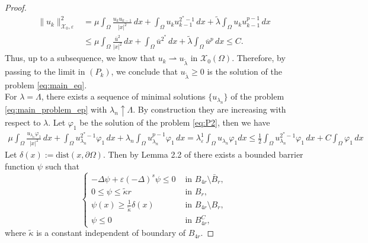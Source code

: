 \documentclass[11pt]{article}
\newcommand{\om} {\Omega}
\newcommand{\la} {\lambda}
\newcommand{\La} {\Lambda}
\newcommand{\ka}{\kappa}
\newcommand{\X}{\mathcal{X}_0} %
\newcommand{\Xe}{\mathcal{X}_{0},\varepsilon} %
\begin{document}
\begin{proof}
\begin{equation*}
\begin{aligned}
\|u_k\|^2_{\Xe} 
&= \mu \int_{\Omega} \frac{u_k u_{k-1}}{|x|^2} \, dx 
+ \int_{\Omega} u_k u_{k-1}^{2^*-1} \, dx 
+ \tilde\lambda \int_{\Omega} u_k u_{k-1}^{p-1} \, dx \\[6pt]
&\leq \mu \int_{\Omega} \frac{\overline{u}^2}{|x|^2} \, dx
+ \int_{\Omega} \overline{u}^{2^*} \, dx 
+ \tilde\lambda \int_{\Omega} \overline{u}^p \, dx \leq C.
\end{aligned}
\end{equation*}
Thus, up to a subsequence, we know that \(u_k \rightharpoonup u_{\tilde\lambda}\) in \(\X(\Omega)\).  
Therefore, by passing to the limit in \((P_k)\), we conclude that \(u_{\tilde\lambda} \geq 0\) is the solution of the problem \eqref{eq:main_eq}. \\
For $\la = \La$, there exists a sequence of minimal solutions $\{ u _{\la_n}\}$ of the problem \eqref{eq:main_problem_ep}
 with $\la_n \uparrow \La$. By construction they are increasing with respect to $\la$. Let $\varphi_1$ be the solution of the problem \eqref{eq:P2}, then we have 
 \begin{equation}\label{eq:bound_minimal_seq}
 \begin{aligned}
 \mu \int_{\Omega} \frac{ u_{\la_n} \varphi_1}{|x|^2} \, dx 
+ \int_{\Omega} u_{\la_n}^{2^*-1} \varphi_1 \, dx 
+ \lambda_n \int_{\Omega} u_{\la_n}^{p-1} \varphi_1 \, dx = \la_{\varepsilon}^1 \int_{\om} u_{\la_n}\varphi_1  dx\leq \frac{1}{2} \int_{\Omega} u_{\la_n}^{2^*-1} \varphi_1 \, dx + C \int_{\om} \varphi_1 \, dx
\end{aligned}
 \end{equation}
 Let $\delta(x):= \text{dist}(x, \partial \Omega)$. Then by Lemma 2.2 of \cite{biswas2023boundary} there exists a bounded barrier function $\psi$ such that
\begin{equation*}
   \begin{cases}
       - \Delta \psi + \varepsilon (-\Delta)^s \psi \leq 0 &\text{ in } B_{4r} \setminus \bar{B}_r,\\
       0 \leq \psi \leq \tilde\ka r &\text{ in } B_r,\\
       \psi(x) \geq \frac{1}{\tilde \ka} \delta(x) & \text{ in } B_{4r} \setminus B_r,\\
       \psi \leq 0 & \text{ in } B_{4r}^C,
   \end{cases}
\end{equation*}
where $\tilde \ka$ is a constant independent of boundary of $B_{4r}$. 

\end{proof}
\end{document}

